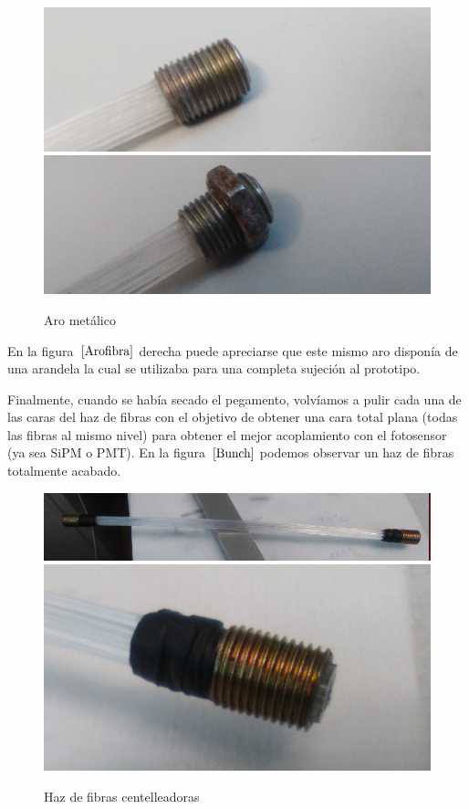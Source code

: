 \begin{figure}[htb]
\centering
{
\includegraphics[scale=0.3]{arometalico.png} 
}
{
\includegraphics[scale=0.3]{arometalicoconrosca.png} 
}
\caption{Aro metálico\label{Arofibra}}
\end{figure} 

En la figura~$\ref{Arofibra}$ derecha puede apreciarse que este mismo aro disponía de una arandela la cual se utilizaba para una completa sujeción al prototipo.

Finalmente, cuando se había secado el pegamento, volvíamos a pulir cada una de las caras del haz de fibras con el objetivo de obtener una cara total plana (todas las fibras al mismo nivel) para obtener el mejor acoplamiento con el fotosensor (ya sea SiPM o PMT). En la figura~$\ref{Bunch}$ podemos observar un  haz de fibras totalmente acabado.

\begin{figure}[htb]
\centering
{
\includegraphics[scale=0.3]{bunchfibras.png} 
}
{
\includegraphics[scale=0.3]{bunchfibras1.png} 
}
\caption{Haz de fibras centelleadoras\label{Bunch}}
\end{figure} 


